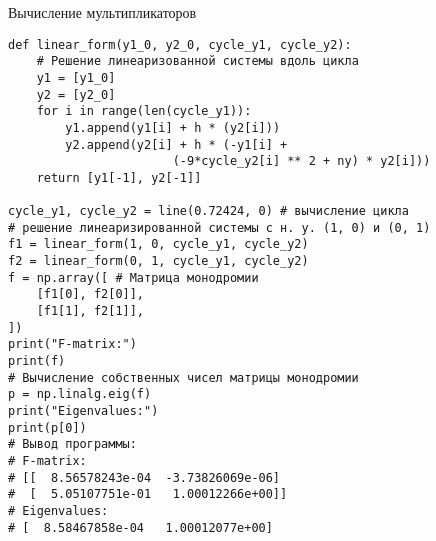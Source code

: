 \begin{program}
    \caption{Вычисление мультипликаторов}
    \label{lab4:prog:1}
    \begin{verbatim}
def linear_form(y1_0, y2_0, cycle_y1, cycle_y2):
    # Решение линеаризованной системы вдоль цикла
    y1 = [y1_0]
    y2 = [y2_0]
    for i in range(len(cycle_y1)):
        y1.append(y1[i] + h * (y2[i]))
        y2.append(y2[i] + h * (-y1[i] +
                       (-9*cycle_y2[i] ** 2 + ny) * y2[i]))
    return [y1[-1], y2[-1]]

cycle_y1, cycle_y2 = line(0.72424, 0) # вычисление цикла
# решение линеаризированной системы с н. у. (1, 0) и (0, 1)
f1 = linear_form(1, 0, cycle_y1, cycle_y2)
f2 = linear_form(0, 1, cycle_y1, cycle_y2)
f = np.array([ # Матрица монодромии
    [f1[0], f2[0]],
    [f1[1], f2[1]],
])
print("F-matrix:")
print(f)
# Вычисление собственных чисел матрицы монодромии
p = np.linalg.eig(f)
print("Eigenvalues:")
print(p[0])
# Вывод программы:
# F-matrix:
# [[  8.56578243e-04  -3.73826069e-06]
#  [  5.05107751e-01   1.00012266e+00]]
# Eigenvalues:
# [  8.58467858e-04   1.00012077e+00]
    \end{verbatim}
\end{program}